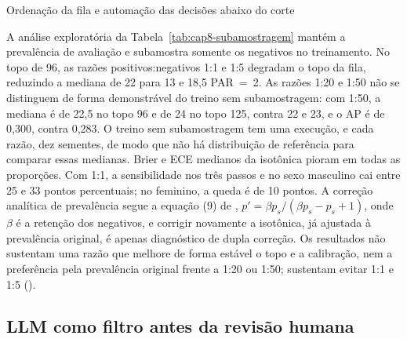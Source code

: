 \begin{chapter}{Ordenação da fila e automação das decisões abaixo do corte}


A análise exploratória da Tabela~\ref{tab:cap8-subamostragem} mantém a prevalência de avaliação e subamostra somente os negativos no treinamento. No topo de 96, as razões positivos:negativos 1:1 e 1:5 degradam o topo da fila, reduzindo a mediana de 22 para 13 e 18,5 PAR~=~2. As razões 1:20 e 1:50 não se distinguem de forma demonstrável do treino sem subamostragem: com 1:50, a mediana é de 22,5 no topo 96 e de 24 no topo 125, contra 22 e 23, e o AP é de 0,300, contra 0,283. O treino sem subamostragem tem uma execução, e cada razão, dez sementes, de modo que não há distribuição de referência para comparar essas medianas. Brier e ECE medianos da isotônica pioram em todas as proporções. Com 1:1, a sensibilidade nos três passos e no sexo masculino cai entre 25 e 33 pontos percentuais; no feminino, a queda é de 10 pontos. A correção analítica de prevalência segue a equação (9) de , $p'=\beta p_s/(\beta p_s-p_s+1)$, onde $\beta$ é a retenção dos negativos, e corrigir novamente a isotônica, já ajustada à prevalência original, é apenas diagnóstico de dupla correção. Os resultados não sustentam uma razão que melhore de forma estável o topo e a calibração, nem a preferência pela prevalência original frente a 1:20 ou 1:50; sustentam evitar 1:1 e 1:5 ().

\subsection{LLM como filtro antes da revisão humana}\label{sec:e4-filtro}




\end{chapter}
